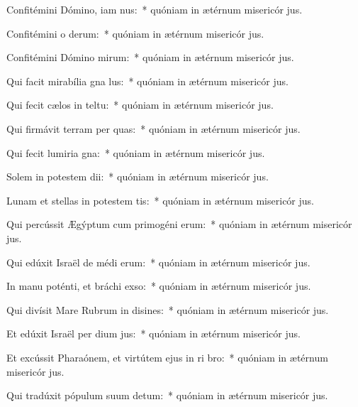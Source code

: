 \item Confitémini Dómino, iam nus:~* quóniam in ætérnum misericór jus.
\item Confitémini o derum:~* quóniam in ætérnum misericór jus.
\item Confitémini Dómino mirum:~* quóniam in ætérnum misericór jus.
\item Qui facit mirabília gna lus:~* quóniam in ætérnum misericór jus.
\item Qui fecit cælos in teltu:~* quóniam in ætérnum misericór jus.
\item Qui firmávit terram per quas:~* quóniam in ætérnum misericór jus.
\item Qui fecit lumiria gna:~* quóniam in ætérnum misericór jus.
\item Solem in potestem dii:~* quóniam in ætérnum misericór jus.
\item Lunam et stellas in potestem tis:~* quóniam in ætérnum misericór jus.
\item Qui percússit Ægýptum cum primogéni erum:~* quóniam in ætérnum misericór jus.
\item Qui edúxit Israël de médi erum:~* quóniam in ætérnum misericór jus.
\item In manu poténti, et bráchi exso:~* quóniam in ætérnum misericór jus.
\item Qui divísit Mare Rubrum in disines:~* quóniam in ætérnum misericór jus.
\item Et edúxit Israël per dium jus:~* quóniam in ætérnum misericór jus.
\item Et excússit Pharaónem, et virtútem ejus in ri bro:~* quóniam in ætérnum misericór jus.
\item Qui tradúxit pópulum suum  detum:~* quóniam in ætérnum misericór jus.

